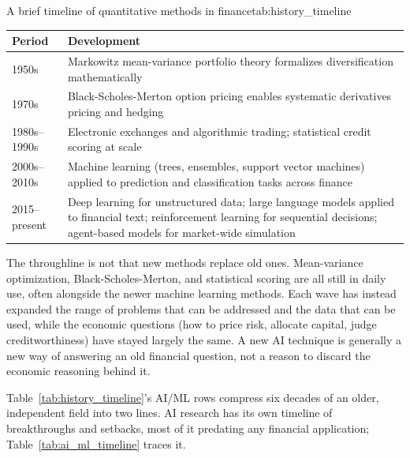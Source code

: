 \documentclass[../ai_in_finance]{subfiles}
\begin{document}
\begin{booktable}[htbp]{A brief timeline of quantitative methods in finance}{tab:history_timeline}
\begin{tabular}{L{2.4cm}L{9.6cm}}
\toprule
Period & Development \\
\midrule
1950s & Markowitz mean-variance portfolio theory formalizes diversification mathematically \\
1970s & Black-Scholes-Merton option pricing enables systematic derivatives pricing and hedging \\
1980s--1990s & Electronic exchanges and algorithmic trading; statistical credit scoring at scale \\
2000s--2010s & Machine learning (trees, ensembles, support vector machines) applied to prediction and classification tasks across finance \\
2015--present & Deep learning for unstructured data; large language models applied to financial text; reinforcement learning for sequential decisions; agent-based models for market-wide simulation \\
\bottomrule
\end{tabular}
\end{booktable}

The throughline is not that new methods replace old ones. Mean-variance optimization, Black-Scholes-Merton, and statistical scoring are all still in daily use, often alongside the newer machine learning methods. Each wave has instead expanded the range of problems that can be addressed and the data that can be used, while the economic questions (how to price risk, allocate capital, judge creditworthiness) have stayed largely the same. A new AI technique is generally a new way of answering an old financial question, not a reason to discard the economic reasoning behind it.

Table~\ref{tab:history_timeline}'s AI/ML rows compress six decades of an older, independent field into two lines. AI research has its own timeline of breakthroughs and setbacks, most of it predating any financial application; Table~\ref{tab:ai_ml_timeline} traces it.
\end{document}
